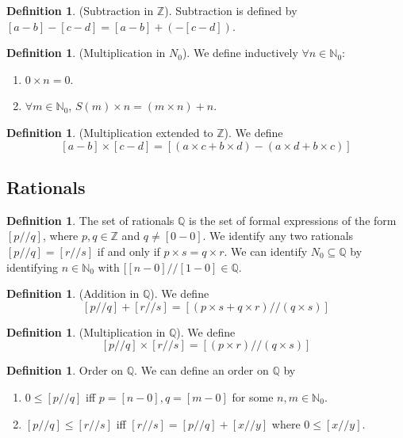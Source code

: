 \documentclass[10pt]{article}
\newcommand{\N}{\mathbb{N}}
\newcommand{\Z}{\mathbb{Z}}
\newcommand{\Q}{\mathbb{Q}}
\theoremstyle{definition}
\newtheorem{definition}[theorem]{Definition}
\theoremstyle{remark}
\begin{document}
\begin{definition}
    (Subtraction in $\Z$).
    Subtraction is defined by $[a - b] - [c - d] = [a - b] + (-[c - d])$.
\end{definition}

\begin{definition}
    (Multiplication in $N_0$).
    We define inductively $\forall n \in \N_0$:
    \begin{enumerate}
        \item $0 \times n = 0$.
        \item $\forall m \in \N_0$, $S(m) \times n = (m \times n) + n$.
    \end{enumerate}
\end{definition}

\begin{definition}
    (Multiplication extended to $\Z$).
    We define
    $$[a - b] \times [c - d] = [(a \times c + b \times d) - (a \times d + b \times c)]$$
\end{definition}

\subsection{Rationals}

\begin{definition}
    The set of rationals $\Q$ is the set of formal expressions of the form $[p // q]$, where $p, q\in \Z$
    and $q \neq [0 - 0]$. We identify any two rationals $[p // q] = [r // s]$ if and only if $p \times s = q \times r$.
    We can identify $N_0 \subseteq \Q$ by identifying $n \in \N_0$ with $[[n - 0] // [1 - 0] \in \Q$.
\end{definition}

\begin{definition}
    (Addition in $\Q$).
    We define
    $$[p // q] + [r // s] = [(p \times s + q \times r) // (q \times s)]$$
\end{definition}

\begin{definition}
    (Multiplication in $\Q$).
    We define
    $$[p // q] \times [r // s] = [(p \times r) // (q \times s)]$$
\end{definition}

\begin{definition}
    {Order on $\Q$}.
    We can define an order on $\Q$ by
    \begin{enumerate}
        \item $0 \leq [p // q]$ iff $p = [n - 0], q = [m - 0]$ for some $n, m \in \N_0$.
        \item $[p // q] \leq [r // s]$ iff $[r // s] = [p // q] + [x // y]$ where $0 \leq [x // y]$.
    \end{enumerate}
\end{definition}
\end{document}
